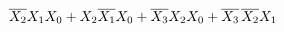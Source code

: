 \documentclass[preview]{standalone}
\begin{document}
\begin{align*}
\overline{X_2}X_1X_0+X_2\overline{X_1}X_0+\overline{X_3}X_2X_0+\overline{X_3}\hspace{0.05cm}\overline{X_2}X_1
\end{align*}
\end{document}
